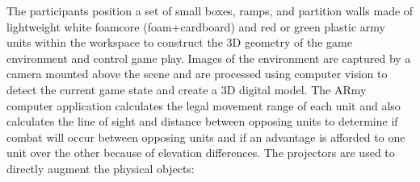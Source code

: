 \documentclass[12pt]{article}
\begin{document}
The participants position a set of small boxes, ramps, and partition
walls made of lightweight white foamcore (foam+cardboard) and red or
green plastic army units within the workspace to construct the 3D
geometry of the game environment and control game play.  Images of the
environment are captured by a camera mounted above the scene and are
processed using computer vision to detect the current game state and
create a 3D digital model.  The ARmy computer application calculates
the legal movement range of each unit and also calculates the line of
sight and distance between opposing units to determine if combat will
occur between opposing units and if an advantage is afforded to one
unit over the other because of elevation differences.  The projectors are used to
directly augment the physical objects:
\end{document}
